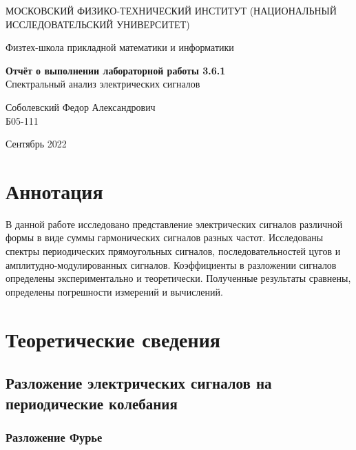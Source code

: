 \documentclass[a4paper,12pt]{article} %
\date{\today}
\begin{document}
\begin{titlepage}
	\begin{center}
		{\large МОСКОВСКИЙ ФИЗИКО-ТЕХНИЧЕСКИЙ ИНСТИТУТ (НАЦИОНАЛЬНЫЙ ИССЛЕДОВАТЕЛЬСКИЙ УНИВЕРСИТЕТ)}
	\end{center}
	\begin{center}
		{\large Физтех-школа прикладной математики и информатики}
	\end{center}
	
	
	\vspace{4.5cm}
	{\huge
		\begin{center}
			{\bf Отчёт о выполнении лабораторной работы 3.6.1}\\
			Спектральный анализ электрических сигналов
		\end{center}
	}
	\vspace{1cm}
	\begin{center}
		{\large Соболевский Федор Александрович \\
			\vspace{0.2cm}
			Б05-111}
	\end{center}
	\vspace{8cm}
	\begin{center}
		Сентябрь 2022
	\end{center}
\end{titlepage}

\section{Аннотация}

В данной работе исследовано представление электрических сигналов различной формы в виде суммы гармонических сигналов разных частот. Исследованы спектры периодических прямоугольных сигналов, последовательностей цугов и амплитудно-модулированных сигналов. Коэффициенты в разложении сигналов определены экспериментально и теоретически. Полученные результаты сравнены, определены погрешности измерений и вычислений.

\section{Теоретические сведения}

\subsection{Разложение электрических сигналов на периодические колебания}

\subsubsection*{Разложение Фурье}
\end{document}
